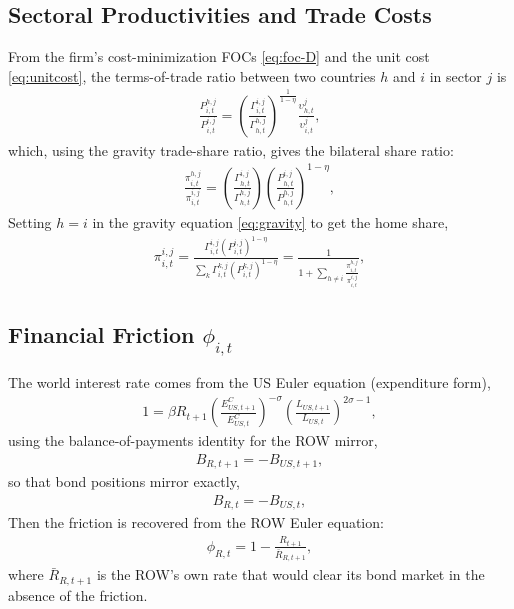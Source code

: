 \documentclass[10pt]{article}
\begin{document}
\subsection*{Sectoral Productivities and Trade Costs}
From the firm's cost-minimization FOCs \eqref{eq:foc-D} and the unit cost
\eqref{eq:unitcost}, the terms-of-trade ratio between two countries $h$ and $i$
in sector $j$ is
\begin{align}
  \frac{P^{h,j}_{i,t}}{P^{i,j}_{i,t}} =
  \left( \frac{\Gamma^{i,j}_{i,t}}{\Gamma^{h,j}_{h,t}} \right)^{\frac{1}{1 - \eta}}
  \frac{\upsilon^{j}_{h,t}}{\upsilon^{j}_{i,t}}, \label{eq:Phi-inv}
\end{align}
which, using the gravity trade-share ratio, gives the bilateral share ratio:
\begin{align}
  \frac{\pi^{h,j}_{i,t}}{\pi^{i,j}_{i,t}} =
  \left( \frac{\Gamma^{i,j}_{h,t}}{\Gamma^{h,j}_{h,t}} \right)
  \left( \frac{P^{i,j}_{h,t}}{P^{h,j}_{h,t}} \right)^{1 - \eta}, \label{eq:gravity-ratio}
\end{align}
Setting $h = i$ in the gravity equation \eqref{eq:gravity} to get the home share,
\begin{align}
  \pi^{i,j}_{i,t} = \frac{\Gamma^{i,j}_{i,t} \left( P^{i,j}_{i,t} \right)^{1 - \eta}}
  {\sum_{k} \Gamma^{k,j}_{i,t} \left( P^{k,j}_{i,t} \right)^{1 - \eta}} =
  \frac{1}{1 + \sum_{h \neq i} \frac{\pi^{h,j}_{i,t}}{\pi^{i,j}_{i,t}}}, \label{eq:homeshare}
\end{align}

\subsection*{Financial Friction $\phi_{i,t}$}
The world interest rate comes from the US Euler equation (expenditure form),
\begin{align}
  1 = \beta R_{t+1} \left( \frac{E^C_{US,t+1}}{E^C_{US,t}} \right)^{-\sigma}
  \left( \frac{L_{US,t+1}}{L_{US,t}} \right)^{2\sigma - 1}, \label{eq:euler-exp}
\end{align}
using the balance-of-payments identity for the ROW mirror,
\begin{align}
  B_{R,t+1} = - B_{US,t+1}, \label{eq:bop}
\end{align}
so that bond positions mirror exactly,
\begin{align}
  B_{R,t} = - B_{US,t}, \label{eq:bmirror}
\end{align}
Then the friction is recovered from the ROW Euler equation:
\begin{align}
  \phi_{R,t} = 1 - \frac{R_{t+1}}{\bar{R}_{R,t+1}}, \label{eq:phi-recover}
\end{align}
where $\bar{R}_{R,t+1}$ is the ROW's own rate that would clear its bond market
in the absence of the friction.
\end{document}
